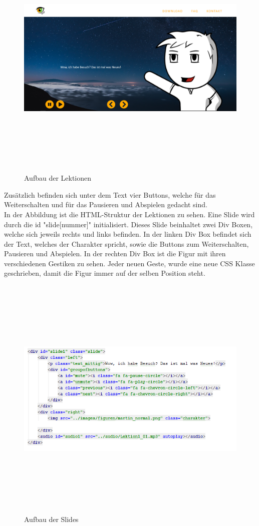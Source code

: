 \begin{figure}[H]
	\centering				\includegraphics[width=12cm,height=12cm,keepaspectratio]{webseite_abb9} 
	\caption{Aufbau der Lektionen}
\end{figure}
Zusätzlich befinden sich unter dem Text vier Buttons, welche für das Weiterschalten und für das Pausieren und Abspielen gedacht sind. \leavevmode \\
In der Abbildung ist die HTML-Struktur der Lektionen zu sehen. Eine Slide wird durch die id "slide[nummer]" initialisiert. Dieses Slide beinhaltet zwei Div Boxen, welche sich jeweils rechts und links befinden. In der linken Div Box befindet sich der Text, welches der Charakter spricht, sowie die Buttons zum Weiterschalten, Pausieren und Abspielen. In der rechten Div Box ist die Figur mit ihren verschiedenen Gestiken zu sehen. Jeder neuen Geste, wurde eine neue CSS Klasse geschrieben, damit die Figur immer auf der selben Position steht.
\begin{figure}[H]
	\centering
\includegraphics[width=12cm,height=12cm,keepaspectratio]{webseite_abb10} 
	\caption{Aufbau der Slides}
\end{figure}
